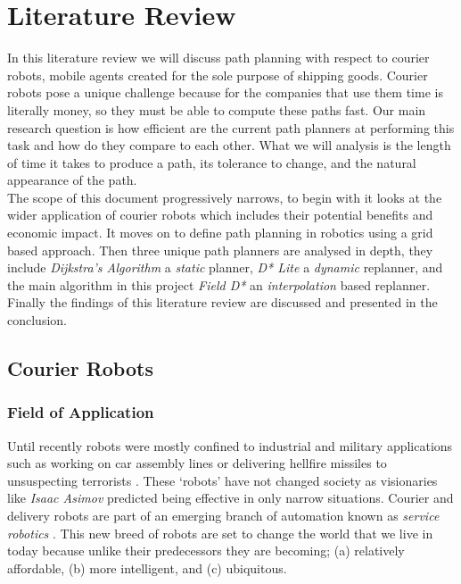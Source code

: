 \chapter{Literature Review}


\noindent
In this literature review we will discuss path planning with respect to courier robots, mobile agents created for the sole purpose of shipping goods. Courier robots pose a unique challenge because for the companies that use them time is literally money, so they must be able to compute these paths fast. Our main research question is how efficient are the current path planners at performing this task and how do they compare to each other. What we will analysis is the length of time it takes to produce a path, its tolerance to change, and the natural appearance of the path.\\

\noindent
The scope of this document progressively narrows, to begin with it looks at the wider application of courier robots which includes their potential benefits and economic impact. It moves on to define path planning in robotics using a grid based approach. Then three unique path planners are analysed in depth, they include \textit{Dijkstra's Algorithm} \cite{DIJKSTRA} a \textit{static} planner, \textit{D* Lite} \cite{D*LITE} a \textit{dynamic} replanner, and the main algorithm in this project \textit{Field D*} an \textit{interpolation} based replanner. Finally the findings of this literature review are discussed and presented in the conclusion.

\newpage


\section{Courier Robots}

\subsection{Field of Application}
\noindent
Until recently robots were mostly confined to industrial and military applications such as working on car assembly lines or delivering hellfire missiles to unsuspecting terrorists \cite{DRONE}. These `robots' have not changed society as visionaries like \textit{Isaac Asimov} predicted being effective in only narrow situations. Courier and delivery robots are part of an emerging branch of automation known as \textit{service robotics} \cite{SERVICE}. This new breed of robots are set to change the world that we live in today because unlike their predecessors they are becoming; (a) relatively affordable, (b) more intelligent, and (c) ubiquitous.\\

